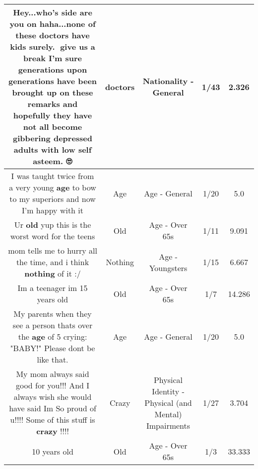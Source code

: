 \documentclass[11pt]{article}
\newlength\mylength
\begin{document}
\begin{center}
\begin{longtable}{|C{.65\mylength}|C{.30\mylength}|C{.12\mylength}|C{.12\mylength}|C{.12\mylength}|}
  \small Hey...who's side are you on haha...none of these \textbf{doctors} have kids surely.😬  give us a break I'm sure generations upon generations have been brought up on these remarks and hopefully they have not all become gibbering depressed adults with low self asteem. 🙄\normalsize   & doctors & Nationality - General & 1/43 & 2.326 \\  \hline
  \small I was taught twice from a very young \textbf{age} to bow to my superiors and now I'm happy with it\normalsize   & Age & Age - General & 1/20 & 5.0 \\  \hline
  \small Ur \textbf{old} yup this is the worst word for the teens\normalsize   & Old & Age - Over 65s & 1/11 & 9.091 \\  \hline
  \small mom tells me to hurry all the time, and i think \textbf{nothing} of it :/\normalsize   & Nothing & Age - Youngsters & 1/15 & 6.667 \\  \hline
  \small Im a teenager im 15 years old\normalsize   & Old & Age - Over 65s & 1/7 & 14.286 \\  \hline
  \small My parents when they see a person thats over the \textbf{age} of 5 crying: "BABY!" Please dont be like that.\normalsize   & Age & Age - General & 1/20 & 5.0 \\  \hline
  \small My mom always said good for you!!! And I always wish she would have said Im So proud of u!!!! Some of this stuff is \textbf{crazy} !!!!\normalsize   & Crazy & Physical Identity - Physical (and Mental) Impairments & 1/27 & 3.704 \\  \hline
  \small 10 years old\normalsize   & Old & Age - Over 65s & 1/3 & 33.333 \\  \hline

\end{longtable}
\end{center}
\end{document}
